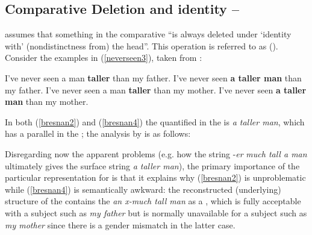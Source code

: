 \subsection{Comparative Deletion and identity -- \citet{bresnan1973}} \label{sec:3comparativedeletion}
\citet[316]{bresnan1973} assumes that something in the comparative  ``is always deleted under `identity with' (nondistinctness from) the head''. This operation is referred to as  (\citealt[317]{bresnan1973}). Consider the examples in (\ref{neverseen3}), taken from \citet[316, ex. 242]{bresnan1973}:

\ea \label{neverseen3}
\ea I've never seen a man \textbf{taller} than my father.\label{bresnan1}
\ex	I've never seen \textbf{a taller man} than my father.\label{bresnan2}
\ex	I've never seen a man \textbf{taller} than my mother.\label{bresnan3}
\ex	I've never seen \textbf{a taller man} than my mother.\label{bresnan4}
\z
\z

In both (\ref{bresnan2}) and (\ref{bresnan4}) the quantified  in the  is \textit{a taller man}, which has a parallel in the ; the analysis by \citet[317, ex. 245]{bresnan1973} is as follows:

\ea \label{bresnantree} \upshape
{}
\z

Disregarding now the apparent  problems (e.g. how the string \mbox{-\textit{er}} \textit{much tall a man} ultimately gives the surface string \textit{a taller man}), the primary importance of the particular representation for \citet{bresnan1973} is that it explains why (\ref{bresnan2}) is unproblematic while (\ref{bresnan4}) is semantically awkward: the reconstructed (underlying) structure of the  contains the  \textit{an x-much tall man} as a , which is fully acceptable with a subject such as \textit{my father} but is normally unavailable for a subject such as \textit{my mother} since there is a gender mismatch in the latter case.

